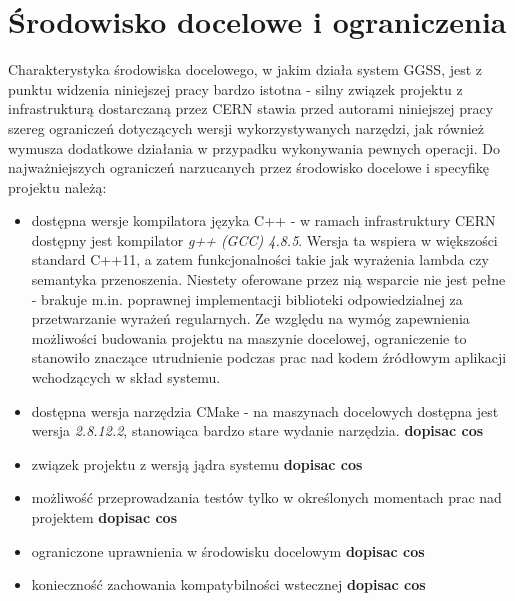 \section{Środowisko docelowe i ograniczenia}
Charakterystyka środowiska docelowego, w jakim działa system GGSS, jest z punktu widzenia niniejszej pracy bardzo istotna - silny związek projektu z infrastrukturą dostarczaną przez CERN stawia przed autorami niniejszej pracy szereg ograniczeń dotyczących wersji wykorzystywanych narzędzi, jak również wymusza dodatkowe działania w przypadku wykonywania pewnych operacji. Do najważniejszych ograniczeń narzucanych przez środowisko docelowe i specyfikę projektu należą:
\begin{itemize}
    \item dostępna wersje kompilatora języka C++ - w ramach infrastruktury CERN dostępny jest kompilator \emph{g++ (GCC) 4.8.5}. Wersja ta wspiera w większości standard C++11, a zatem funkcjonalności takie jak wyrażenia lambda czy semantyka przenoszenia. Niestety oferowane przez nią wsparcie nie jest pełne - brakuje m.in. poprawnej implementacji biblioteki odpowiedzialnej za przetwarzanie wyrażeń regularnych. Ze względu na wymóg zapewnienia możliwości budowania projektu na maszynie docelowej, ograniczenie to stanowiło znaczące utrudnienie podczas prac nad kodem źródłowym aplikacji wchodzących w skład systemu.
    \item dostępna wersja narzędzia CMake - na maszynach docelowych dostępna jest wersja \emph{2.8.12.2}, stanowiąca bardzo stare wydanie narzędzia. \textbf{dopisac cos}
    \item związek projektu z wersją jądra systemu \textbf{dopisac cos}
    \item możliwość przeprowadzania testów tylko w określonych momentach prac nad projektem \textbf{dopisac cos}
    \item ograniczone uprawnienia w środowisku docelowym \textbf{dopisac cos}
    \item konieczność zachowania kompatybilności wstecznej \textbf{dopisac cos}
\end{itemize}



